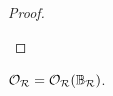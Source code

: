 \begin{proof}
\begin{byCase}
    \end{byCase}
\end{proof}

\begin{axiom}\label{topological_space_reals}
    $\opens[\reals] = \genOpens{\topoBasisReals}{\reals}$.
\end{axiom}

